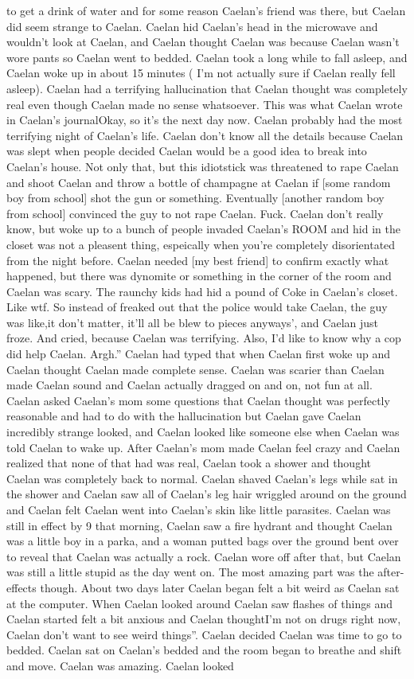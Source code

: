 \documentclass[12pt]{book}
\begin{document}
to get a drink of water and for some reason Caelan's friend was there, but Caelan did seem strange to Caelan. Caelan hid Caelan's head in the microwave and wouldn't look at Caelan, and Caelan thought Caelan was because Caelan wasn't wore pants so Caelan went to bedded. Caelan took a long while to fall asleep, and Caelan woke up in about 15 minutes ( I'm not actually sure if Caelan really fell asleep). Caelan had a terrifying hallucination that Caelan thought was completely real even though Caelan made no sense whatsoever. This was what Caelan wrote in Caelan's journalOkay, so it's the next day now. Caelan probably had the most terrifying night of Caelan's life. Caelan don't know all the details because Caelan was slept when people decided Caelan would be a good idea to break into Caelan's house. Not only that, but this idiotstick was threatened to rape Caelan and shoot Caelan and throw a bottle of champagne at Caelan if [some random boy from school] shot the gun or something. Eventually [another random boy from school] convinced the guy to not rape Caelan. Fuck. Caelan don't really know, but woke up to a bunch of people invaded Caelan's ROOM and hid in the closet was not a pleasent thing, espeically when you're completely disorientated from the night before. Caelan needed [my best friend] to confirm exactly what happened, but there was dynomite or something in the corner of the room and Caelan was scary. The raunchy kids had hid a pound of Coke in Caelan's closet. Like wtf. So instead of freaked out that the police would take Caelan, the guy was like,it don't matter, it'll all be blew to pieces anyways', and Caelan just froze. And cried, because Caelan was terrifying. Also, I'd like to know why a cop did help Caelan. Argh.'' Caelan had typed that when Caelan first woke up and Caelan thought Caelan made complete sense. Caelan was scarier than Caelan made Caelan sound and Caelan actually dragged on and on, not fun at all. Caelan asked Caelan's mom some questions that Caelan thought was perfectly reasonable and had to do with the hallucination but Caelan gave Caelan incredibly strange looked, and Caelan looked like someone else when Caelan was told Caelan to wake up. After Caelan's mom made Caelan feel crazy and Caelan realized that none of that had was real, Caelan took a shower and thought Caelan was completely back to normal. Caelan shaved Caelan's legs while sat in the shower and Caelan saw all of Caelan's leg hair wriggled around on the ground and Caelan felt Caelan went into Caelan's skin like little parasites. Caelan was still in effect by 9 that morning, Caelan saw a fire hydrant and thought Caelan was a little boy in a parka, and a woman putted bags over the ground bent over to reveal that Caelan was actually a rock. Caelan wore off after that, but Caelan was still a little stupid as the day went on. The most amazing part was the after-effects though. About two days later Caelan began felt a bit weird as Caelan sat at the computer. When Caelan looked around Caelan saw flashes of things and Caelan started felt a bit anxious and Caelan thoughtI'm not on drugs right now, Caelan don't want to see weird things''. Caelan decided Caelan was time to go to bedded. Caelan sat on Caelan's bedded and the room began to breathe and shift and move. Caelan was amazing. Caelan looked 
\end{document}
